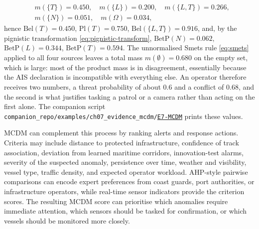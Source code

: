 \documentclass[graybox,envcountchap]{style/SNmono}
\newcommand{\repopath}[1]{\texttt{#1}}
\providecommand{\DIFadd}[1]{{\protect\color{blue} #1}} %
\providecommand{\DIFdel}[1]{{\protect\color{red} #1}} %
\DeclareRobustCommand{\RtwoDel}[1]{{\color{red}%
  \renewcommand{\DIFadd}[1]{##1}\renewcommand{\DIFdel}[1]{##1}%
  #1}}
\DeclareRobustCommand{\RtwoAdd}[1]{{\color{blue}#1}}
\DeclareRobustCommand{\codeentry}[1]{\hyperref[code:#1]{\texttt{#1}}}
\begin{document}
\begin{example}
\begin{equation}
\begin{aligned}
&m(\{T\})=0.450,\quad m(\{L\})=0.200,\quad m(\{L,T\})=0.266,\\
&m(\{N\})=0.051,\quad m(\Omega)=0.034,
\end{aligned}
\end{equation}
hence $\mathrm{Bel}(T)=0.450$, $\mathrm{Pl}(T)=0.750$, $\mathrm{Bel}(\{L,T\})=0.916$, and, by the pignistic transformation \eqref{eq:pignistic-transform}, $\mathrm{BetP}(N)=0.062$, $\mathrm{BetP}(L)=0.344$, $\mathrm{BetP}(T)=0.594$. The unnormalised Smets rule \eqref{eq:smets} applied to all four sources leaves a total mass $m(\emptyset)=0.680$ on the empty set, which is large: most of the product mass is in disagreement, essentially because the AIS declaration is incompatible with everything else. An operator therefore receives two numbers, a threat probability of about $0.6$ and a conflict of $0.68$, and the second is what justifies tasking a patrol or a camera rather than acting on the first alone. The companion script \RtwoDel{\repopath{companion\_\allowbreak repo/\allowbreak examples/\allowbreak ch07\_\allowbreak evidence\_\allowbreak mcdm/\allowbreak }}\RtwoAdd{\codeentry{E7-MCDM}} prints these values.
\end{example}


MCDM can complement this process by ranking alerts and response actions. Criteria may include distance to protected infrastructure, confidence of track association, deviation from learned maritime corridors, innovation-test alarms, severity of the suspected anomaly, persistence over time, weather and visibility, vessel type, traffic density, and expected operator workload. AHP-style pairwise comparisons can encode expert preferences from coast guards, port authorities, or infrastructure operators, while real-time sensor indicators provide the criterion scores. The resulting MCDM score can prioritise which anomalies require immediate attention, which sensors should be tasked for confirmation, or which vessels should be monitored more closely.
\end{document}
